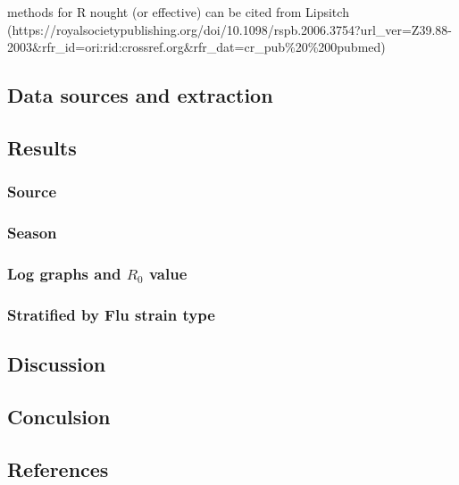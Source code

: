 \documentclass[
  letterpaper,
  DIV=11,
  numbers=noendperiod]{scrartcl}
\begin{document}
methods for R nought (or effective) can be cited from Lipsitch
(https://royalsocietypublishing.org/doi/10.1098/rspb.2006.3754?url\_ver=Z39.88-2003\&rfr\_id=ori:rid:crossref.org\&rfr\_dat=cr\_pub\%20\%200pubmed)

\hypertarget{data-sources-and-extraction}{%
\subsection{Data sources and
extraction}\label{data-sources-and-extraction}}

\hypertarget{results}{%
\subsection{Results}\label{results}}

\hypertarget{source}{%
\subsubsection{Source}\label{source}}

\hypertarget{season}{%
\subsubsection{Season}\label{season}}

\hypertarget{log-graphs-and-r_0-value}{%
\subsubsection{\texorpdfstring{Log graphs and \(R_0\)
value}{Log graphs and R\_0 value}}\label{log-graphs-and-r_0-value}}

\hypertarget{stratified-by-flu-strain-type}{%
\subsubsection{Stratified by Flu strain
type}\label{stratified-by-flu-strain-type}}

\hypertarget{discussion}{%
\subsection{Discussion}\label{discussion}}

\hypertarget{conculsion}{%
\subsection{Conculsion}\label{conculsion}}

\hypertarget{references}{%
\subsection{References}\label{references}}
\end{document}
